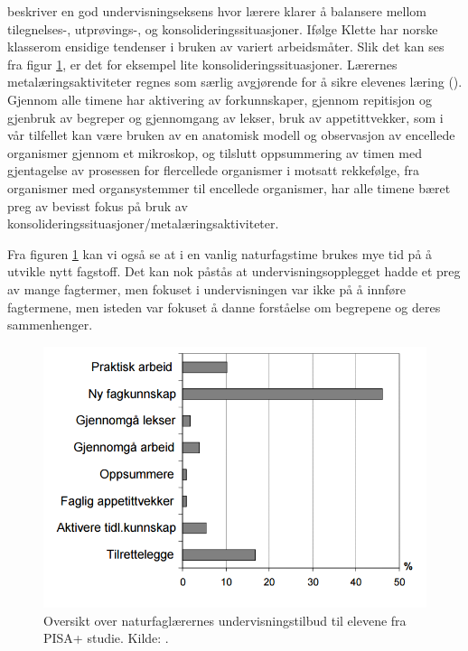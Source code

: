 \documentclass[main.tex]{subfiles}
\begin{document}
 beskriver en god undervisningseksens hvor lærere klarer å balansere mellom tilegnelses-,
utprøvings-, og konsolideringssituasjoner. Ifølge Klette har norske klasserom ensidige tendenser i bruken av 
variert arbeidsmåter. Slik det kan ses fra figur \ref{fig:odeg10}, er det for eksempel lite konsolideringssituasjoner.
Lærernes metalæringsaktiviteter regnes som særlig avgjørende for å sikre elevenes læring ().
Gjennom alle timene har aktivering av forkunnskaper, gjennom repitisjon og gjenbruk av begreper og gjennomgang av 
lekser, bruk av appetittvekker, som i vår tilfellet kan være bruken av en anatomisk modell og observasjon av
encellede organismer gjennom et mikroskop, og tilslutt oppsummering av timen med gjentagelse av prosessen
for flercellede organismer i motsatt rekkefølge, fra organismer med organsystemmer til encellede organismer, har 
alle timene bæret preg av bevisst fokus på bruk av konsolideringssituasjoner/metalæringsaktiviteter. 

Fra figuren \ref{fig:odeg10} kan vi også se at i en vanlig naturfagstime brukes mye tid på å utvikle nytt fagstoff.
Det kan nok påstås at undervisningsopplegget hadde et preg av mange fagtermer, men fokuset i undervisningen var ikke
på å innføre fagtermene, men isteden var fokuset å danne forståelse om begrepene og deres sammenhenger. 

\begin{figure}[h!]
\includegraphics[scale = 0.6]{../figures/undervisnings_aktivitet.png}
\caption{Oversikt over naturfaglærernes undervisningstilbud til elevene fra PISA+ studie. Kilde: \protect{}.}
\label{fig:odeg10}
\end{figure}
\end{document}
